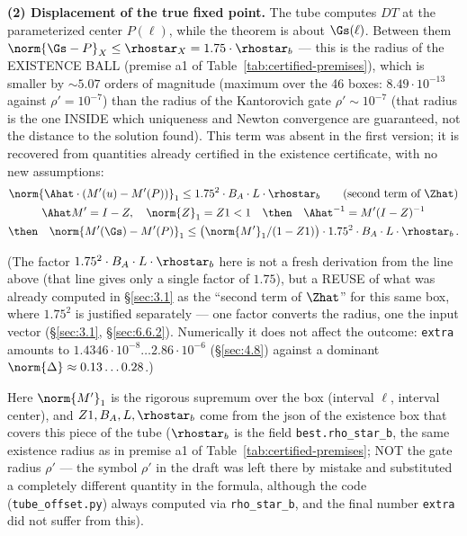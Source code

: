 \textbf{(2) Displacement of the true fixed point.} The tube computes $DT$ at the
parameterized center $P(\ell)$, while the theorem is about $\Gs(\ell)$. Between
them $\norm{\Gs - P}_X \le \rhostar_X = 1.75\cdot\rhostar_b$ --- this is the radius of the EXISTENCE
BALL (premise a1 of Table~\ref{tab:certified-premises}), which is smaller by ${\sim}5.07$ orders of magnitude (maximum over the
46 boxes: $8.49\cdot 10^{-13}$ against $\rho' = 10^{-7}$) than the radius of the
Kantorovich gate $\rho' \sim 10^{-7}$ (that radius is the one INSIDE which
uniqueness and Newton convergence are guaranteed, not the distance to the
solution found). This term was absent in the first version; it is
recovered from quantities already certified in the existence certificate,
with no new assumptions:
\begin{gather*}
\norm{\Ahat\cdot(M'(u) - M'(P))}_{1} \le 1.75^{2}\cdot B_A\cdot L\cdot\rhostar_b \qquad \text{(second term of $\Zhat$)} \\
\Ahat M' = I - Z, \quad \norm{Z}_{1} = Z1 < 1 \quad\then\quad \Ahat^{-1} = M'(I - Z)^{-1} \\
\then\quad \norm{M'(\Gs) - M'(P)}_{1} \le \bigl( \norm{M'}_{1} / (1 - Z1) \bigr) \cdot 1.75^{2}\cdot B_A\cdot L\cdot\rhostar_b\,.
\end{gather*}

(The factor $1.75^{2}\cdot B_A\cdot L\cdot\rhostar_b$ here is not a fresh derivation from the
line above (that line gives only a single factor of $1.75$), but a REUSE
of what was already computed in \S\ref{sec:3.1} as the ``second term of $\Zhat$'' for this
same box, where $1.75^{2}$ is justified separately --- one factor converts the
radius, one the input vector (\S\ref{sec:3.1}, \S\ref{sec:6.6.2}). Numerically it does not affect the outcome: \texttt{extra}
amounts to $1.4346\cdot 10^{-8}\dots 2.86\cdot 10^{-6}$ (\S\ref{sec:4.8}) against a dominant
$\norm{\Delta}\approx 0.13\dots 0.28$.)

Here $\norm{M'}_{1}$ is the rigorous supremum over the box (interval $\ell$, interval
center), and $Z1, B_A, L, \rhostar_b$ come from the json of the existence box
that covers this piece of the tube ($\rhostar_b$ is the field \texttt{best.rho\_\allowbreak star\_\allowbreak b},
the same existence radius as in premise a1 of Table~\ref{tab:certified-premises};
NOT the gate radius $\rho'$ --- the symbol
$\rho'$ in the draft was left there by mistake and substituted a completely
different quantity in the formula, although the code (\texttt{tube\_\allowbreak offset.py})
always computed via \texttt{rho\_star\_b}, and the final number \texttt{extra} did not
suffer from this).

